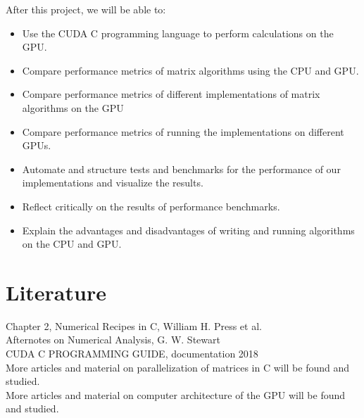 After this project, we will be able to:

\begin{itemize}
    \item Use the CUDA C programming language to perform calculations on the GPU.
    \item Compare performance metrics of matrix algorithms using the CPU and GPU.
    \item Compare performance metrics of different implementations of matrix algorithms on the GPU
    \item Compare performance metrics of running the implementations on different GPUs.
    \item Automate and structure tests and benchmarks for the performance of our implementations and visualize the results.
    \item Reflect critically on the results of performance benchmarks.
    \item Explain the advantages and disadvantages of writing and running algorithms on the CPU and GPU.
\end{itemize}


\section*{Literature}
Chapter 2, Numerical Recipes in C, William H. Press et al.\\
Afternotes on Numerical Analysis, G. W. Stewart\\
CUDA C PROGRAMMING GUIDE, documentation 2018\\
More articles and material on parallelization of matrices in C will be found and studied.\\
More articles and material on computer architecture of the GPU will be found and studied.\\